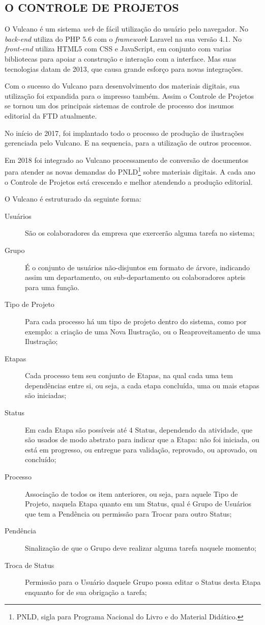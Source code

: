 \documentclass[
  12pt,				%
  openany,
  oneside,
  a4paper,			%
  english,			%
  brazil
]{article}
\numberwithin{figure}{section}
\numberwithin{table}{section}
\begin{document}
\subsection{O CONTROLE DE PROJETOS}

O Vulcano é um sistema \textit{web} de fácil utilização do usuário pelo navegador. No \textit{back-end} utiliza do PHP 5.6 com o \textit{framework} Laravel na sua versão 4.1. No \textit{front-end} utiliza HTML5 com CSS e JavaScript, em conjunto com varias bibliotecas para apoiar a construção e interação com a interface. Mas suas tecnologias datam de 2013, que causa grande esforço para novas integrações.

Com o sucesso do Vulcano para desenvolvimento dos materiais digitais, sua utilização foi expandida para o impresso também. Assim o Controle de Projetos se tornou um dos principais sistemas de controle de processo dos insumos editorial da FTD atualmente. 

No início de 2017, foi implantado todo o processo de produção de ilustrações gerenciada pelo Vulcano. E na sequencia, para a utilização de outros processos.

Em 2018 foi integrado ao Vulcano processamento de conversão de documentos para atender as novas demandas do PNLD\footnote{PNLD, sigla para Programa Nacional do Livro e do Material Didático.} sobre materiais digitais. A cada ano o Controle de Projetos está crescendo e melhor atendendo a produção editorial.

O Vulcano é estruturado da seguinte forma:

\begin{description}
	\item[Usuários] São os colaboradores da empresa que exercerão alguma tarefa no sistema;
	\item[Grupo] É o conjunto de usuários não-disjuntos em formato de árvore, indicando assim um departamento, ou sub-departamento ou colaboradores apteis para uma função.
	\item[Tipo de Projeto] Para cada processo há um tipo de projeto dentro do sistema, como por exemplo: a criação de uma Nova Ilustração, ou o Reaproveitamento de uma Ilustração;
	\item[Etapas] Cada processo tem seu conjunto de Etapas, na qual cada uma tem dependências entre si, ou seja, a cada etapa concluída, uma ou mais etapas são iniciadas;
	\item[Status] Em cada Etapa são possíveis até 4 Status, dependendo da atividade, que são usados de modo abstrato para indicar que a Etapa: não foi iniciada, ou está em progresso, ou entregue para validação, reprovado, ou aprovado, ou concluído;
	\item[Processo] Associação de todos os item anteriores, ou seja, para aquele Tipo de Projeto, naquela Etapa quanto em um Status, qual é Grupo de Usuários que tem a Pendência ou permissão para Trocar para outro Status;
	\item[Pendência] Sinalização de que o Grupo deve realizar alguma tarefa naquele momento;
	\item[Troca de Status] Permissão para o Usuário daquele Grupo possa editar o Status desta Etapa enquanto for de sua obrigação a tarefa;
\end{description}
\end{document}
